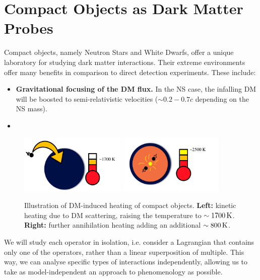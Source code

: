 \section{Compact Objects as Dark Matter Probes}


Compact objects, namely Neutron Stars and White Dwarfs, offer a unique
laboratory for studying dark matter interactions. Their extreme environments
offer many benefits in comparison to direct detection experiments. 
These include:

\begin{itemize}
\item \textbf{Gravitational focusing of the DM flux.} In the NS case, the 
infalling DM will be boosted to semi-relativistic velocities ($\sim 0.2 - 0.7 c$
depending on the NS mass).
\item 
\end{itemize}


\begin{figure}
    \centering
    \includegraphics[width=0.45\textwidth]{img/chapter_1/kin_heat_NS.pdf}
    \includegraphics[width=0.45\textwidth]{img/chapter_1/ann_heat_NS.pdf}
    \caption{Illustration of DM-induced heating of compact objects. \textbf{Left:} kinetic heating due to DM scattering, raising the temperature to $\sim 1700 {\rm \,K}$. \textbf{Right:} further annihilation heating adding an additional $\sim 800{\rm \,K}$.}
    \label{fig:cartoon_NS_heat}
\end{figure}





We will study each operator in isolation, i.e. consider a Lagrangian that contains only one of the operators, rather than a linear superposition of multiple. This way, we can analyse specific types of interactions independently, allowing us to take as model-independent an approach to phenomenology as possible. 